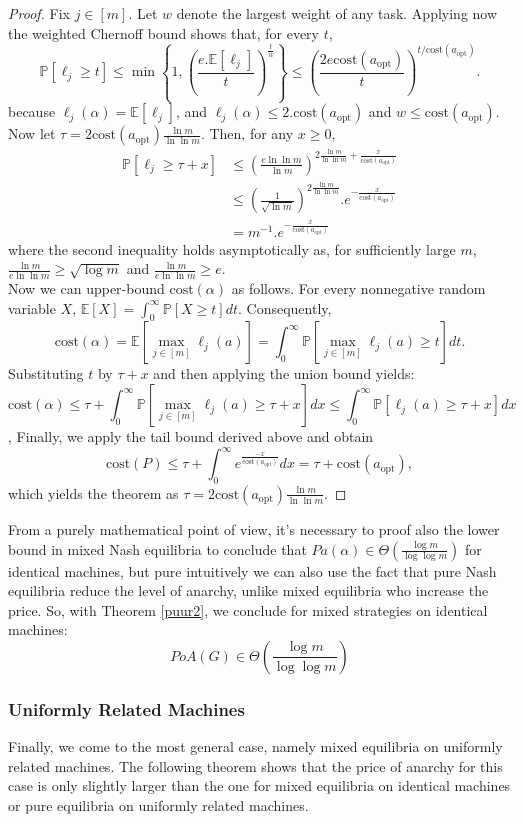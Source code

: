 \documentclass[a4paper,11pt]{article}
\renewcommand{\P}{{\mathbb P}}
\newcommand{\E}{{\mathbb E}}
\newcommand{\cost}{\text{cost}}
\newcommand{\opt}{\text{opt}}
\newcommand{\copt}{\cost(a_{\opt})}
\begin{document}
\begin{proof}
Fix $j \in [m]$. Let $w$ denote the largest weight of any task. Applying now the weighted Chernoff bound shows that, for every $t$,
$$\P[\ell_j \geq t] \leq \min\left\{1, \left(\frac{e.\E[\ell_j]}{t}\right)^{\frac{t}{w}} \right\}      \leq \left(\frac{2e\copt}{t}\right)^{t/\copt}.$$
because $\ell_j(\alpha) = \E[\ell_j]$, and $\ell_j(\alpha) \leq 2.\copt$ and $w \leq \copt$. Now let $\tau = 2\copt\frac{\ln m}{\ln \ln m}$. Then, for any $x \geq 0$,
\begin{eqnarray*}
\P[\ell_j \geq \tau + x] &\leq \left(\frac{e\ln\ln m}{\ln m}\right)^{2\frac{\ln m}{\ln \ln m} + \frac{x}{\copt}}\\
&\leq  \left(\frac{1}{\sqrt{\ln m}}\right)^{2\frac{\ln m}{\ln \ln m}}.e^{-\frac{x}{\copt}}\\
&= m^{-1}.e^{-\frac{x}{\copt}}
\end{eqnarray*}
where the second inequality holds asymptotically as, for sufficiently large $m$, $\frac{\ln m}{e \ln \ln m} \geq \sqrt{\log m}$ and $\frac{\ln m}{e \ln \ln m} \geq e$.\\
Now we can upper-bound $\cost(\alpha)$ as follows. For every nonnegative random variable $X$, $\E[X] = \int_0^\infty \P[X \geq t]dt$. Consequently,
$$\cost(\alpha) = \E\left[\max_{j\in[m]}\ell_j(a)\right] = \displaystyle\int_0^\infty{\P[\max_{j\in[m]}\ell_j(a) \geq t]}dt.$$
Substituting $t$ by $\tau + x$ and then applying the union bound yields:
$$\cost(\alpha) \leq \tau + \displaystyle\int_0^\infty{\P[\max_{j\in[m]}\ell_j(a) \geq \tau + x]}dx \leq
\displaystyle\int_0^\infty{\P[\ell_j(a) \geq \tau + x]}dx$$,
Finally, we apply the tail bound derived above and obtain
$$\cost(P) \leq \tau + \displaystyle\int_0^\infty{e^{\frac{-x}{\copt}}}dx = \tau + \copt,$$
which yields the theorem as $\tau = 2\copt\frac{\ln m}{\ln\ln m}.$

\end{proof}
From a purely mathematical point of view, it's necessary to proof also the lower bound in mixed Nash equilibria to conclude that $Pa(\alpha) \in \Theta(\frac{\log m}{\log \log m})$ for identical machines, but pure intuitively we can also use the fact that pure Nash equilibria reduce the level of anarchy, unlike mixed equilibria who increase the price. So, with Theorem \ref{puur2}, we conclude for mixed strategies on identical machines:
$$PoA(G) \in \Theta\left(\frac{\log m}{\log \log m}\right)$$

\subsubsection {Uniformly Related Machines}
Finally, we come to the most general case, namely mixed equilibria on uniformly related machines. The following theorem shows that the price of anarchy for this case is only slightly larger than the one for mixed equilibria on identical machines or pure equilibria on uniformly related machines.
\end{document}
